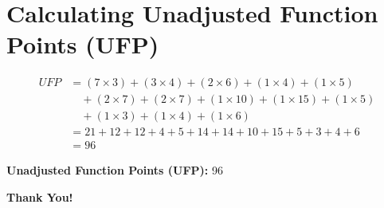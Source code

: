 \documentclass[a4paper,12pt]{article}
\begin{document}
\section{Calculating Unadjusted Function Points (UFP)}
\begin{center}

\begin{align*}
    UFP &= (7 \times 3) + (3 \times 4) + (2 \times 6) + (1 \times 4) + (1 \times 5)\\
    &\quad + (2 \times 7) + (2 \times 7) + (1 \times 10) + (1 \times 15) + (1 \times 5)\\
    &\quad  + (1 \times 3) + (1 \times 4) + (1 \times 6) \\
    &= 21 + 12 + 12 + 4 + 5 + 14 + 14 + 10 + 15 + 5 + 3 + 4 + 6 \\
    &= 96
\end{align*}
\end{center}
\textbf{Unadjusted Function Points (UFP):} 96

\begin{center}
\vspace{4cm}
    \Huge\textbf{Thank You!}
\end{center}
\end{document}
